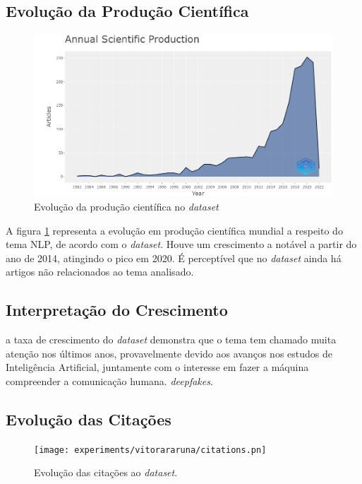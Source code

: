 \subsection{Evolução da Produção Científica}

\begin{figure}
    \centering
    \includegraphics[width=1\textwidth]{experiments/vitorararuna/epc.png}
    \caption{Evolução da produção científica no \textit{dataset}}
    \label{fig:evol:anual:DEEPFAKES@vitorararuna}
\end{figure}

A figura \ref{fig:evol:anual:DEEPFAKES@vitorararuna} representa a evolução em produção científica mundial a respeito do tema NLP, de acordo com o \textit{dataset}. Houve um crescimento a notável a partir do ano de 2014, atingindo o pico em 2020. 
É perceptível que no \textit{dataset} ainda há artigos não relacionados ao tema analisado.

\subsection{Interpretação do Crescimento} a taxa de crescimento do \textit{dataset} demonstra que o tema tem chamado muita atenção nos últimos anos, provavelmente devido aos avanços nos estudos de Inteligência Artificial, juntamente com o interesse em fazer a máquina compreender a comunicação humana. \textit{deepfakes}.

\subsection{Evolução das Citações}

\begin{figure}
    \centering
    \texttt{[image: experiments/vitorararuna/citations.pn]}
    \caption{Evolução das citações ao \textit{dataset}.}
    \label{fig:evol:anual:citacoes:DEEPFAKES@vitorararuna}
\end{figure}

